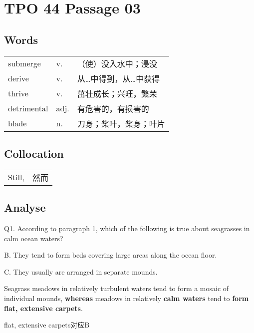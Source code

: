 \section{TPO 44 Passage 03}

\subsection{Words}

\begin{tabular}{lll}
    submerge    & v.   & （使）没入水中；浸没  \\
    derive      & v.   & 从…中得到，从…中获得 \\
    thrive      & v.   & 茁壮成长；兴旺，繁荣  \\
    detrimental & adj. & 有危害的，有损害的   \\
    blade       & n.   & 刀身；桨叶，桨身；叶片 \\
\end{tabular}

\subsection{Collocation}

\begin{tabular}{ll}
    Still, & 然而 \\
\end{tabular}

\subsection{Analyse}

\begin{blk}
    \begin{qst}
        Q1. According to paragraph 1, which of the following is true about seagrasses in calm ocean waters?
    \end{qst}

    \begin{chc}
        B. They tend to form beds covering large areas along the ocean floor.

        C. They usually are arranged in separate mounds.
    \end{chc}

    \begin{psgq}
        Seagrass meadows in relatively turbulent waters tend to form a mosaic of individual mounds, \textbf{whereas} meadows in relatively \textbf{calm waters} tend to \textbf{form flat, extensive carpets}.
    \end{psgq}

    \begin{nlz}
        flat, extensive carpets对应B
    \end{nlz}
\end{blk}
